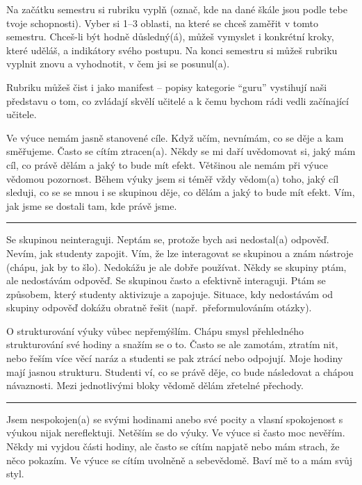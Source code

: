 Na začátku semestru si rubriku vyplň (označ, kde na dané škále jsou podle tebe tvoje schopnosti). Vyber si 1--3 oblasti, na které se chceš zaměřit v tomto semestru. Chceš-li být hodně důsledný(á), můžeš vymyslet i konkrétní kroky, které uděláš, a indikátory svého postupu. Na konci semestru si můžeš rubriku vyplnit znovu a vyhodnotit, v čem jsi se posunul(a).

Rubriku můžeš čist i jako manifest -- popisy kategorie \enquote{guru} vystihují naši představu o tom, co zvládají skvělí učitelé a k čemu bychom rádi vedli začínající učitele.


\newpage
{}
{Ve výuce nemám jasně stanovené cíle. Když učím, nevnímám, co se děje a kam směřujeme. Často se cítím ztracen(a).}
{Někdy se mi daří uvědomovat si, jaký mám cíl, co právě dělám a jaký to bude mít efekt. Většinou ale nemám při výuce vědomou pozornost.}
{Během výuky jsem si téměř vždy vědom(a) toho, jaký cíl sleduji, co se se mnou i se skupinou děje, co dělám a jaký to bude mít efekt. Vím, jak jsme se dostali tam, kde právě jsme.}

\rule{\textwidth}{0.4pt}
{Se skupinou neinteraguji. Neptám se, protože bych asi nedostal(a) odpověď. Nevím, jak studenty zapojit.}
{Vím, že lze interagovat se skupinou a znám nástroje (chápu, jak by to šlo). Nedokážu je ale dobře používat. Někdy  se skupiny ptám, ale nedostávám odpověď.}
{Se skupinou často a efektivně interaguji. Ptám se způsobem, který studenty aktivizuje a zapojuje. Situace, kdy nedostávám od skupiny odpověď dokážu obratně řešit (např.\ přeformulováním otázky).}

\newpage
{}
{O strukturování výuky vůbec nepřemýšlím.}
{Chápu smysl přehledného strukturování své hodiny a snažím se o to. Často se ale zamotám, ztratím nit, nebo řeším více věcí naráz a studenti se pak ztrácí nebo odpojují.}
{Moje hodiny mají jasnou strukturu. Studenti ví, co se právě děje, co bude následovat a chápou návaznosti. Mezi jednotlivými bloky vědomě dělám zřetelné přechody.}

\rule{\textwidth}{0.4pt}
{Jsem nespokojen(a) se svými hodinami anebo své pocity a vlasní spokojenost s výukou nijak nereflektuji. Netěším se do výuky.}
{Ve výuce si často moc nevěřím. Někdy mi vyjdou části hodiny, ale často se cítím napjatě nebo mám strach, že něco pokazím.}
{Ve výuce se cítím uvolněně a sebevědomě. Baví mě to a mám svůj styl.}

